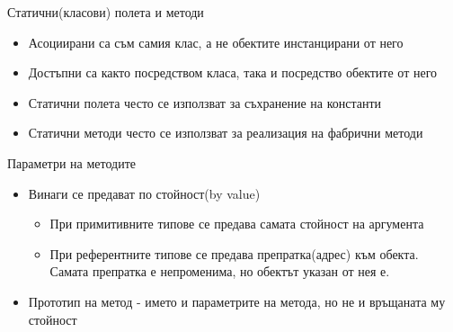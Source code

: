 \documentclass{beamer}
\begin{document}
\begin{frame}{Статични(класови) полета и методи}
  \transdissolve
  \begin{itemize}
  \item Асоциирани са съм самия клас, а не
    обектите инстанцирани от него \pause
  \item Достъпни са както посредством класа,
    така и посредство обектите от него \pause
  \item Статични полета често се използват за
    съхранение на константи \pause
  \item Статични методи често се използват за
    реализация на фабрични методи
  \end{itemize}
\end{frame}

\begin{frame}{Параметри на методите}
  \transdissolve
  \begin{itemize}
  \item Винаги се предават по стойност(by value) \pause
    \begin{itemize}
    \item При примитивните типове се предава самата стойност на
      аргумента \pause
    \item При референтните типове се предава препратка(адрес) към
      обекта. Самата препратка е непроменима, но обектът указан от
      нея е. \pause
    \end{itemize}
  \item Прототип на метод - името и параметрите на метода, но не и
    връщаната му стойност
  \end{itemize}
\end{frame}
\end{document}
